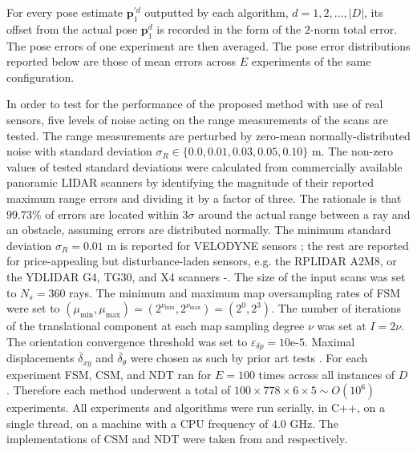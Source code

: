 For every pose estimate $\bm{p}_1^{\prime d}$ outputted by
each algorithm, $d = 1,2,\dots,|D|$, its offset from the actual pose
$\bm{p}_1^d$ is recorded in the form of the $2$-norm total error. The pose
errors of one experiment are then averaged. The pose error distributions
reported below are those of mean errors across $E$ experiments of the same
configuration.

In order to test for the performance of the proposed method with use of real
sensors, five levels of noise acting on the range measurements of the scans are
tested. The range measurements are perturbed by zero-mean normally-distributed
noise with standard deviation $\sigma_R \in \{0.0, 0.01, 0.03, 0.05, 0.10\}$ m.
The non-zero values of tested standard deviations were calculated from
commercially available panoramic LIDAR scanners by identifying the magnitude of
their reported maximum range errors and dividing it by a factor of three. The
rationale is that $99.73\%$ of errors are located within $3\sigma$ around the
actual range between a ray and an obstacle, assuming errors are distributed
normally. The minimum standard deviation $\sigma_R = 0.01$ m is reported for
VELODYNE sensors \cite{velodyne_datasheet}; the rest are reported for
price-appealing but disturbance-laden sensors, e.g. the RPLIDAR A2M8, or the
YDLIDAR G4, TG30, and X4 scanners \cite{a2m8_datasheet}-\cite{x4_datasheet}. The
size of the input scans was set to $N_s=360$ rays. The minimum and maximum map
oversampling rates of FSM were set to $(\mu_{\min},\mu_{\max}) =
(2^{\nu_{\min}},2^{\nu_{\max}}) = (2^0,2^3)$. The number of iterations of the
translational component at each map sampling degree $\nu$ was set at $I =
2\nu$. The orientation convergence threshold was set to $\varepsilon_{\delta p}
= 10$e-$5$. Maximal displacements $\overline{\delta}_{xy}$ and
$\overline{\delta}_\theta$ were chosen as such by prior art tests \cite{plicp}.
For each experiment FSM, CSM, and NDT ran for $E = 100$ times across all
instances of $D$. Therefore each method underwent a total of
$100 \times 778 \times 6 \times 5 \sim O(10^6)$ experiments.
All experiments and algorithms were run serially, in C++, on
a single thread, on a machine with a CPU frequency of $4.0$ GHz. The
implementations of CSM and NDT were taken from \cite{csm_implementation} and
\cite{ndt_implementation} respectively.
